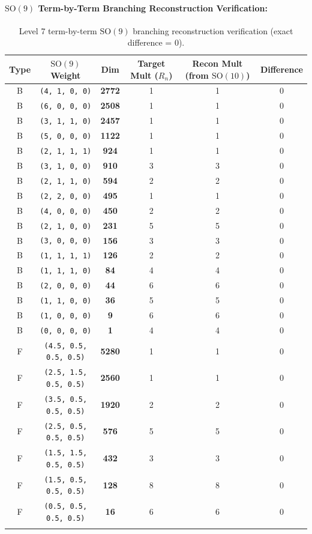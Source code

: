 \documentclass[11pt,a4paper]{article}
\begin{document}
\paragraph{$\mathrm{SO}(9)$ Term-by-Term Branching Reconstruction Verification:}
\begin{longtable}{@{}cccccc@{}}
\toprule
Type & $\mathrm{SO}(9)$ Weight & Dim & Target Mult ($R_n$) & Recon Mult (from $\mathrm{SO}(10)$) & Difference \\
\midrule
\endhead
B & \texttt{(4, 1, 0, 0)} & \textbf{2772} & 1 & 1 & 0 \\
B & \texttt{(6, 0, 0, 0)} & \textbf{2508} & 1 & 1 & 0 \\
B & \texttt{(3, 1, 1, 0)} & \textbf{2457} & 1 & 1 & 0 \\
B & \texttt{(5, 0, 0, 0)} & \textbf{1122} & 1 & 1 & 0 \\
B & \texttt{(2, 1, 1, 1)} & \textbf{924} & 1 & 1 & 0 \\
B & \texttt{(3, 1, 0, 0)} & \textbf{910} & 3 & 3 & 0 \\
B & \texttt{(2, 1, 1, 0)} & \textbf{594} & 2 & 2 & 0 \\
B & \texttt{(2, 2, 0, 0)} & \textbf{495} & 1 & 1 & 0 \\
B & \texttt{(4, 0, 0, 0)} & \textbf{450} & 2 & 2 & 0 \\
B & \texttt{(2, 1, 0, 0)} & \textbf{231} & 5 & 5 & 0 \\
B & \texttt{(3, 0, 0, 0)} & \textbf{156} & 3 & 3 & 0 \\
B & \texttt{(1, 1, 1, 1)} & \textbf{126} & 2 & 2 & 0 \\
B & \texttt{(1, 1, 1, 0)} & \textbf{84} & 4 & 4 & 0 \\
B & \texttt{(2, 0, 0, 0)} & \textbf{44} & 6 & 6 & 0 \\
B & \texttt{(1, 1, 0, 0)} & \textbf{36} & 5 & 5 & 0 \\
B & \texttt{(1, 0, 0, 0)} & \textbf{9} & 6 & 6 & 0 \\
B & \texttt{(0, 0, 0, 0)} & \textbf{1} & 4 & 4 & 0 \\
F & \texttt{(4.5, 0.5, 0.5, 0.5)} & \textbf{5280} & 1 & 1 & 0 \\
F & \texttt{(2.5, 1.5, 0.5, 0.5)} & \textbf{2560} & 1 & 1 & 0 \\
F & \texttt{(3.5, 0.5, 0.5, 0.5)} & \textbf{1920} & 2 & 2 & 0 \\
F & \texttt{(2.5, 0.5, 0.5, 0.5)} & \textbf{576} & 5 & 5 & 0 \\
F & \texttt{(1.5, 1.5, 0.5, 0.5)} & \textbf{432} & 3 & 3 & 0 \\
F & \texttt{(1.5, 0.5, 0.5, 0.5)} & \textbf{128} & 8 & 8 & 0 \\
F & \texttt{(0.5, 0.5, 0.5, 0.5)} & \textbf{16} & 6 & 6 & 0 \\
\bottomrule
\caption{Level 7 term-by-term $\mathrm{SO}(9)$ branching reconstruction verification (exact difference = 0).}
\end{longtable}
\end{document}
